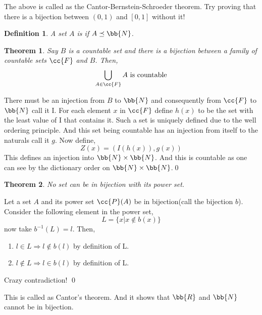 \documentclass{myclass}
\newtheorem*{definition}{Definition}
\newtheorem*{theorem}{Theorem}
\begin{document}
\begin{remark}
    The above is called as the Cantor-Bernstein-Schroeder theorem. Try proving that there is a bijection between $(0,1)$ and $[0,1]$ without it!
\end{remark}

\begin{definition}
    A set $A$ is  if $A\preceq \bb{N}$.
\end{definition}

\begin{theorem}
    Say $B$ is a countable set and there is a bijection between a family of countable sets $\cc{F}$ and $B$. Then,
    $$\bigcup_{A\in \cc{F}}A\text{ is countable}$$
\end{theorem}
\begin{prf}
    There must be an injection from $B$ to $\bb{N}$ and consequently from $\cc{F}$ to $\bb{N}$ call it I. For each element $x$ in $\cc{F}$ define $h(x)$ to be the set with the least value of I that contains it. Such a set is uniquely defined due to the well ordering principle.
    And this set being countable has an injection from itself to the naturals call it $g$. Now define,$$Z(x)=(I(h(x)),g(x))$$
    This defines an injection into $\bb{N}\times \bb{N}$. And this is countable as one can see by the dictionary order on $\bb{N}\times \bb{N}$.\qed
\end{prf}

\begin{theorem}
    No set can be in bijection with its power set.
\end{theorem}
\begin{prf}
    Let a set $A$ and its power set $\cc{P}(A)$ be in bijection(call the bijection $b$). Consider the following element in the power set,
    $$L=\{x|x\notin b(x)\}$$
    now take $b^{-1}(L)=l$. Then,\begin{enumerate}
        \item $l\in L\Longrightarrow l\notin b(l)$ by definition of L.
        \item $l\notin L\Longrightarrow l\in b(l)$ by definition of L.
    \end{enumerate}
    Crazy contradiction! \qed
\end{prf}

\begin{remark}
    This is called as Cantor's theorem. And it shows that $\bb{R}$ and $\bb{N}$ cannot be in bijection. 
    \begin{center}\end{center}
\end{remark}
\end{document}
